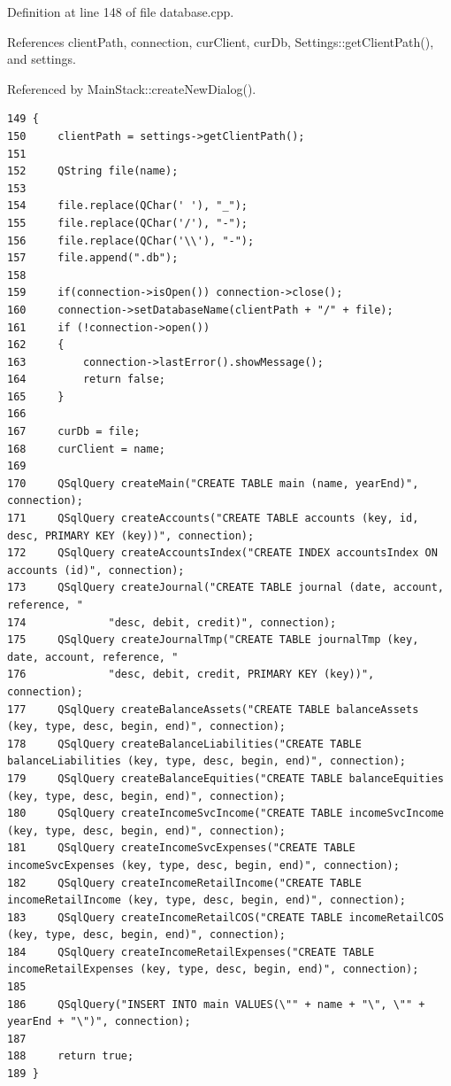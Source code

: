 Definition at line 148 of file database.cpp.

References client\-Path, connection, cur\-Client, cur\-Db, Settings::get\-Client\-Path(), and settings.

Referenced by Main\-Stack::create\-New\-Dialog().

\footnotesize\begin{verbatim}149 {
150     clientPath = settings->getClientPath();
151 
152     QString file(name);
153     
154     file.replace(QChar(' '), "_");
155     file.replace(QChar('/'), "-");
156     file.replace(QChar('\\'), "-");
157     file.append(".db");
158     
159     if(connection->isOpen()) connection->close();
160     connection->setDatabaseName(clientPath + "/" + file);
161     if (!connection->open())
162     {
163         connection->lastError().showMessage();
164         return false;
165     }
166     
167     curDb = file;
168     curClient = name;
169         
170     QSqlQuery createMain("CREATE TABLE main (name, yearEnd)", connection);
171     QSqlQuery createAccounts("CREATE TABLE accounts (key, id, desc, PRIMARY KEY (key))", connection);
172     QSqlQuery createAccountsIndex("CREATE INDEX accountsIndex ON accounts (id)", connection);
173     QSqlQuery createJournal("CREATE TABLE journal (date, account, reference, "
174             "desc, debit, credit)", connection);
175     QSqlQuery createJournalTmp("CREATE TABLE journalTmp (key, date, account, reference, "
176             "desc, debit, credit, PRIMARY KEY (key))", connection);
177     QSqlQuery createBalanceAssets("CREATE TABLE balanceAssets (key, type, desc, begin, end)", connection);
178     QSqlQuery createBalanceLiabilities("CREATE TABLE balanceLiabilities (key, type, desc, begin, end)", connection);
179     QSqlQuery createBalanceEquities("CREATE TABLE balanceEquities (key, type, desc, begin, end)", connection);
180     QSqlQuery createIncomeSvcIncome("CREATE TABLE incomeSvcIncome (key, type, desc, begin, end)", connection);
181     QSqlQuery createIncomeSvcExpenses("CREATE TABLE incomeSvcExpenses (key, type, desc, begin, end)", connection);
182     QSqlQuery createIncomeRetailIncome("CREATE TABLE incomeRetailIncome (key, type, desc, begin, end)", connection);
183     QSqlQuery createIncomeRetailCOS("CREATE TABLE incomeRetailCOS (key, type, desc, begin, end)", connection);
184     QSqlQuery createIncomeRetailExpenses("CREATE TABLE incomeRetailExpenses (key, type, desc, begin, end)", connection);
185     
186     QSqlQuery("INSERT INTO main VALUES(\"" + name + "\", \"" + yearEnd + "\")", connection);
187     
188     return true;
189 }
\end{verbatim}\normalsize 


